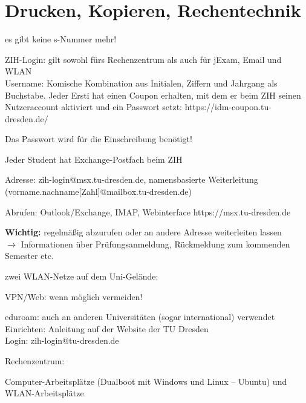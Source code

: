 \documentclass[a4paper,12pt]{report}
\begin{document}
\section{Drucken, Kopieren, Rechentechnik}
\label{rechentechnik}
\begin{itemize*}
	\item es gibt keine s-Nummer mehr!
    \item ZIH-Login: gilt sowohl fürs Rechenzentrum als auch für jExam, Email und WLAN\\
            Username: Komische Kombination aus Initialen, Ziffern und Jahrgang als Buchstabe.
            Jeder Ersti hat einen Coupon erhalten, mit dem er beim ZIH seinen Nutzeraccount aktiviert und ein Passwort setzt: https://idm-coupon.tu-dresden.de/
    \item Das Passwort wird für die Einschreibung benötigt!
    \item Jeder Student hat Exchange-Postfach beim ZIH
    \begin{itemize*}
        \item Adresse: zih-login@msx.tu-dresden.de, namensbasierte Weiterleitung \\(vorname.nachname[Zahl]@mailbox.tu-dresden.de)
        \item Abrufen: Outlook/Exchange, IMAP, Webinterface https://msx.tu-dresden.de
        \item \textbf{Wichtig:} regelmäßig abzurufen oder an andere Adresse weiterleiten lassen\\
        $\rightarrow$ Informationen über Prüfungsanmeldung, Rückmeldung zum kommenden Semester etc.
    \end{itemize*}
    \item zwei WLAN-Netze auf dem Uni-Gelände:
    \begin{itemize*}
        \item VPN/Web: wenn möglich vermeiden!
        \item eduroam: auch an anderen Universitäten (sogar international) verwendet\\
        Einrichten: Anleitung auf der Website der TU Dresden\\
        Login: zih-login@tu-dresden.de
    \end{itemize*}
    \item Rechenzentrum:
    \begin{itemize*}
        \item Computer-Arbeitsplätze (Dualboot mit Windows und Linux -- Ubuntu) und WLAN-Arbeitsplätze

\end{itemize*}
\end{itemize*}
\end{document}
